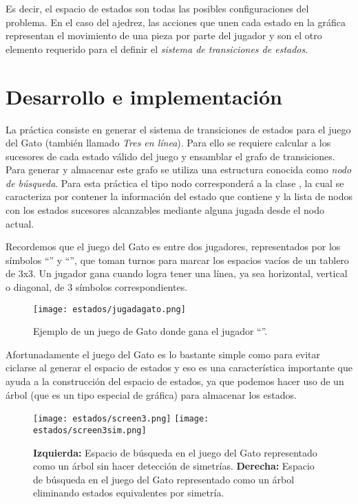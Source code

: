 Es decir, el espacio de estados son todas las posibles configuraciones del problema. En el caso del ajedrez, las acciones que unen cada estado en la gráfica representan el movimiento de una pieza por parte del jugador y son el otro elemento requerido para el definir el \emph{sistema de transiciones de estados}.


\section{Desarrollo e implementaci\'on}

La práctica consiste en generar el sistema de transiciones de estados para el juego del Gato (también llamado \textit{Tres en línea}).  Para ello se requiere calcular a los sucesores de cada estado válido del juego y ensamblar el grafo de transiciones.  Para generar y almacenar este grafo se utiliza una estructura conocida como \emph{nodo de búsqueda}.  Para esta práctica el tipo nodo corresponderá a la clase , la cual se caracteriza por contener la información del estado que contiene y la lista de nodos con los estados sucesores alcanzables mediante alguna jugada desde el nodo actual.

Recordemos que el juego del Gato es entre dos jugadores, representados por los símbolos \enquote{} y \enquote{}, que toman turnos para marcar los espacios vacíos de un tablero de 3x3.
Un jugador gana cuando logra tener una línea, ya sea horizontal, vertical o diagonal, de 3 símbolos correspondientes. 

\begin{figure}
  \centering
  \texttt{[image: estados/jugadagato.png]}
  \caption{Ejemplo de un juego de Gato donde gana el jugador \enquote{}.}
  \label{fig:tictactoe}
\end{figure}

Afortunadamente el juego del Gato es lo bastante simple como para evitar ciclarse al generar el espacio de estados y eso es una característica importante que ayuda a la construcción del espacio de estados, ya que  podemos hacer uso de un árbol (que es un tipo especial de gráfica) para almacenar los estados.\par


\begin{figure}
  \centering
  \texttt{[image: estados/screen3.png]}
  \texttt{[image: estados/screen3sim.png]}
  \caption{\textbf{Izquierda:} Espacio de búsqueda en el juego del Gato representado como un árbol sin hacer detección de simetrías. \textbf{Derecha:} Espacio de búsqueda en el juego del Gato representado como un árbol eliminando estados equivalentes por simetría.}
  \label{fig:espaciogato}
\end{figure}

